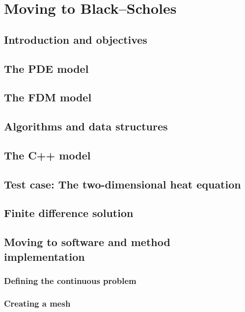 \chapter{Moving to Black–Scholes}

\section{Introduction and objectives}

\section{The PDE model}

\section{The FDM model}

\section{Algorithms and data structures}

\section{The C++ model}

\section{Test case: The two-dimensional heat equation}

\section{Finite difference solution}

\section{Moving to software and method implementation}

\subsection{Defining the continuous problem}

\subsection{Creating a mesh}

